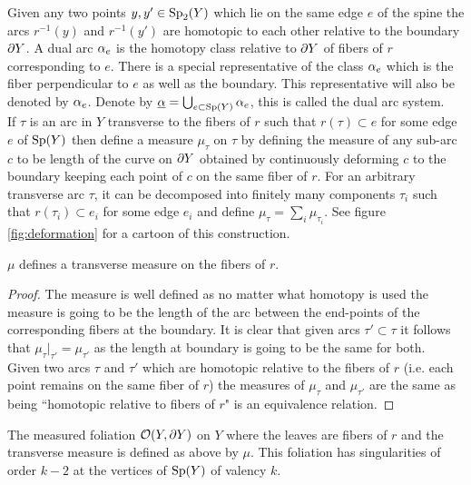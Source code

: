 Given any two points $y,y'\in \text{Sp}_2(Y)$ which lie on the same edge $e$ of the spine the arcs $r^{-1}(y)$ and $r^{-1}(y')$ are homotopic to each other relative to the boundary $\partial Y$. A dual arc $\alpha_e$ is the homotopy class relative to $\partial Y$ of fibers of $r$ corresponding to $e$. There is a special representative of the class $\alpha_e$ which is the fiber perpendicular to $e$ as well as the boundary. This representative will also be denoted by $\alpha_e$. Denote by $\underline{\alpha} = \bigcup_{e\subset \text{Sp}(Y)}\alpha_e$, this is called the dual arc system.\\

If $\tau$ is an arc in $Y$ transverse to the fibers of $r$ such that $r(\tau)\subset e$ for some edge $e$ of $\text{Sp}(Y)$ then define a measure $\mu_\tau$ on $\tau$ by defining the measure of any sub-arc $c$ to be length of the curve on $\partial Y$ obtained by continuously deforming $c$ to the boundary keeping each point of $c$ on the same fiber of $r$. For an arbitrary transverse arc $\tau$, it can be decomposed into finitely many components $\tau_i$ such that $r(\tau_i) \subset e_i$ for some edge $e_i$ and define $\mu_{\tau} = \sum_i \mu_{\tau_i}$. See figure \ref{fig:deformation} for a cartoon of this construction.
\begin{proposition}
  $\mu$ defines a transverse measure on the fibers of $r$. 
\end{proposition}
\begin{proof}
  The measure is well defined as no matter what homotopy is used the measure is going to be the length of the arc between the end-points of the corresponding fibers at the boundary. It is clear that given arcs $\tau'\subset \tau$ it follows that $\mu_\tau\big|_{\tau'} = \mu_{\tau'}$ as the length at boundary is going to be the same for both.\\

  Given two arcs $\tau$ and $\tau'$ which are homotopic relative to the fibers of $r$ (i.e. each point remains on the same fiber of $r$) the measures of $\mu_\tau$ and $\mu_{\tau'}$ are the same as being ``homotopic relative to fibers of $r$" is an equivalence relation. 
\end{proof}
\begin{definition}
  The measured foliation $ \mathcal{O}(Y,\partial Y)$ on $Y$ where the leaves are fibers of $r$ and the transverse measure is defined as above by $\mu$. This foliation has singularities of order $k-2$ at the vertices of $\text{Sp}(Y)$ of valency $k$.
\end{definition}
